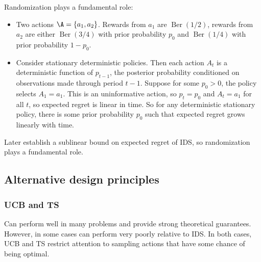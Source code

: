 \documentclass[11pt, openany]{book}
\DeclareMathOperator{\Ber}{Ber}
\begin{document}
Randomization plays a fundamental role:

\begin{example}
    \begin{itemize}
        \item Two actions $\A=\set{a_1,a_2}$. Rewards from $a_1$ are $\Ber(1/2)$, rewards from $a_2$ are either $\Ber(3/4)$ with prior probability $p_0$ and $\Ber(1/4)$ with prior probability $1-p_0$.
        \item Consider stationary deterministic policies. Then each action $A_t$ is a deterministic function of $p_{t-1}$, the posterior probability conditioned on observations made through period $t-1$. Suppose for some $p_0>0$, the policy selects $A_1=a_1$. This is an uninformative action, so $p_t=p_0$ and $A_t=a_1$ for all $t$, so expected regret is linear in time. So for any deterministic stationary policy, there is some prior probability $p_0$ such that expected regret grows linearly with time.
    \end{itemize}
\end{example}

Later establish a sublinear bound on expected regret of IDS, so randomization plays a fundamental role.

\subsection{Alternative design principles}
\subsubsection{UCB and TS}
Can perform well in many problems and provide strong theoretical guarantees. However, in some cases can perform very poorly relative to IDS. In both cases, UCB and TS restrict attention to sampling actions that have some chance of being optimal.
\end{document}
